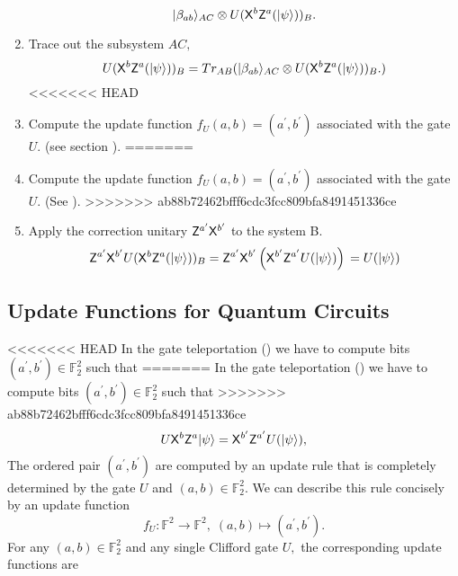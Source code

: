 \begin{algorithm}[]
\begin{enumerate}
 \begin{equation}
  \label{eq:telepprtation3}
							{\lvert}\beta_{ab}\rangle_{AC}\otimes U( {\sf X}^b {\sf Z}^a( {\lvert}\psi\rangle))_B.
\end{equation}
\item Trace out the subsystem $AC,$
 \begin{equation}
  \label{eq:telepprtation5}
U( {\sf X}^b {\sf Z}^a( {\lvert}\psi\rangle))_B=Tr_{AB}({\lvert}\beta_{ab}\rangle_{AC}\otimes U( {\sf X}^b {\sf Z}^a( {\lvert}\psi\rangle))_B.)
 \end{equation}
<<<<<<< HEAD
\item Compute the update function $f_U(a,b)=(a^\prime,b^\prime)$ associated with the gate $U.$ (see section ).
=======
\item Compute the update function $f_U(a,b)=(a^\prime,b^\prime)$ associated with the gate $U.$ (See ).
>>>>>>> ab88b72462bfff6cdc3fcc809bfa8491451336ce
\item Apply the correction unitary ${\sf Z}^{a^\prime}  {\sf X}^{b^\prime}$ to the system B.
 \begin{equation}
  \label{eq:telepprtation5}
  {\sf Z}^{a^\prime}  {\sf X}^{b^\prime} U( {\sf X}^b {\sf Z}^a( {\lvert}\psi\rangle))_B={\sf Z}^{a^\prime}  {\sf X}^{b^\prime} \left({\sf X}^{b^\prime} {\sf Z}^{a^\prime} U( {\lvert}\psi\rangle)\right)\\
  =U( {\lvert}\psi\rangle)
   \end{equation}
\end{enumerate}	
\end{algorithm}	

\subsection{Update Functions for Quantum Circuits}
\label{update function}
<<<<<<< HEAD
In the gate teleportation () we have to compute bits $(a^\prime, b^\prime)\in\mathbb{F}_2^2$ such that
=======
In the gate teleportation () we have to compute bits $(a^\prime, b^\prime)\in\mathbb{F}_2^2$ such that
>>>>>>> ab88b72462bfff6cdc3fcc809bfa8491451336ce
\begin{equation*}
U{\sf X}^b{\sf Z}^a {\lvert}\psi\rangle={\sf X}^{b^\prime}{\sf Z}^{a^\prime}U({\lvert}\psi\rangle),
\end{equation*}
The ordered pair $(a^\prime, b^\prime)$ are computed by an update rule that is completely determined by the gate $U$ and $(a,b)\in\mathbb{F}_2^2.$ We can describe this rule concisely by an update function
\begin{equation*}
f_U:\mathbb{F}^2\rightarrow \mathbb{F}^2, \; (a,b)\mapsto (a^\prime,b^\prime).
\end{equation*}
For any $(a,b)\in\mathbb{F}_2^2$ and any single Clifford gate $U,$ the corresponding update functions are

